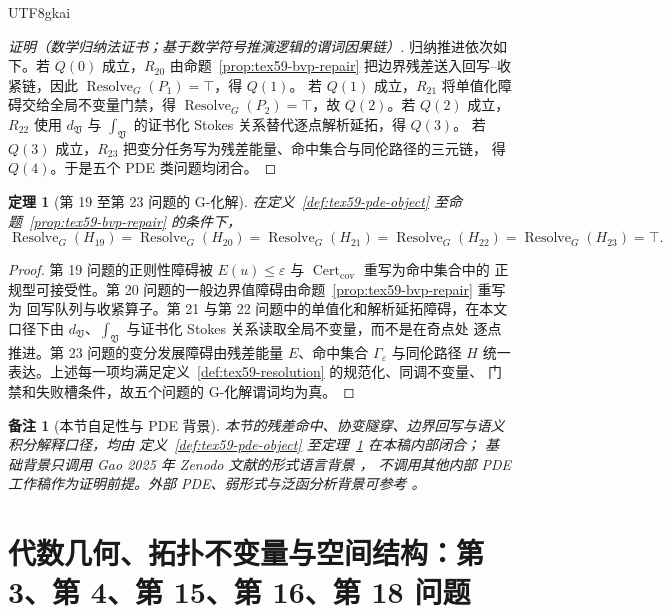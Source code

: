 \documentclass[12pt]{article}
\newtheorem{theorem}{定理}[section]
\newtheorem{remark}{备注}[section]
\newcommand{\Vsys}{\mathfrak V}
\newcommand{\eps}{\varepsilon}
\DeclareMathOperator{\Cert}{Cert}
\DeclareMathOperator{\Resolve}{Resolve}
\begin{document}
\begin{CJK*}{UTF8}{gkai}
\begin{proof}[证明（数学归纳法证书；基于数学符号推演逻辑的谓词因果链）]
归纳推进依次如下。若 \(Q(0)\) 成立，\(R_{20}\) 由命题~\ref{prop:tex59-bvp-repair}
把边界残差送入回写--收紧链，因此 \(\Resolve_G(P_1)=\top\)，得 \(Q(1)\)。
若 \(Q(1)\) 成立，\(R_{21}\) 将单值化障碍交给全局不变量门禁，得
\(\Resolve_G(P_2)=\top\)，故 \(Q(2)\)。若 \(Q(2)\) 成立，\(R_{22}\) 使用
\(d_{\Vsys}\) 与 \(\int_{\Vsys}\) 的证书化 Stokes 关系替代逐点解析延拓，得 \(Q(3)\)。
若 \(Q(3)\) 成立，\(R_{23}\) 把变分任务写为残差能量、命中集合与同伦路径的三元链，
得 \(Q(4)\)。于是五个 PDE 类问题均闭合。
\end{proof}

\begin{theorem}[第 19 至第 23 问题的 G-化解]
\label{thm:tex59-h19-h23}
在定义~\ref{def:tex59-pde-object} 至命题~\ref{prop:tex59-bvp-repair} 的条件下，
\[
  \Resolve_G(H_{19})=\Resolve_G(H_{20})=\Resolve_G(H_{21})
  =\Resolve_G(H_{22})=\Resolve_G(H_{23})=\top.
\]
\end{theorem}

\begin{proof}
第 19 问题的正则性障碍被 \(E(u)\le\eps\) 与 \(\Cert_{\mathrm{cov}}\) 重写为命中集合中的
正规型可接受性。第 20 问题的一般边界值障碍由命题~\ref{prop:tex59-bvp-repair} 重写为
回写队列与收紧算子。第 21 与第 22 问题中的单值化和解析延拓障碍，在本文口径下由
\(d_{\Vsys}\)、\(\int_{\Vsys}\) 与证书化 Stokes 关系读取全局不变量，而不是在奇点处
逐点推进。第 23 问题的变分发展障碍由残差能量 \(E\)、命中集合 \(\Gamma_{\eps}\) 与同伦路径
\(H\) 统一表达。上述每一项均满足定义~\ref{def:tex59-resolution} 的规范化、同调不变量、
门禁和失败槽条件，故五个问题的 G-化解谓词均为真。
\end{proof}

\begin{remark}[本节自足性与 PDE 背景]
本节的残差命中、协变隧穿、边界回写与语义积分解释口径，均由
定义~\ref{def:tex59-pde-object} 至定理~\ref{thm:tex59-h19-h23} 在本稿内部闭合；
基础背景只调用 Gao 2025 年 Zenodo 文献的形式语言背景 \cite{Gao2025PureMathZenodo}，
不调用其他内部 PDE
工作稿作为证明前提。外部 PDE、弱形式与泛函分析背景可参考
\cite{Evans2010PDE,BrennerScott2008FEM,Brezis2011FunctionalAnalysis}。
\end{remark}

\section{代数几何、拓扑不变量与空间结构：第 3、第 4、第 15、第 16、第 18 问题}
\label{sec:tex59-geometry}


\end{CJK*}
\end{document}
